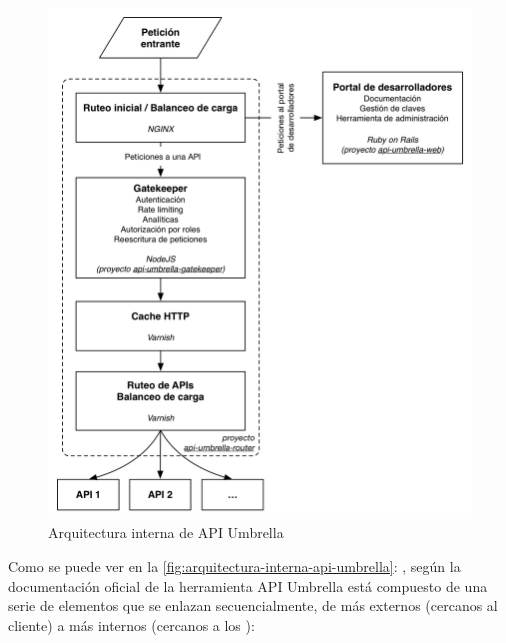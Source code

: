 \begin{figure}
  \includegraphics[width=\linewidth]{src/images/03-capitulo-3/tecnologias/api-umbrella/api-umbrella-arquitectura.png}
  \caption{Arquitectura interna de API Umbrella}
  \label{fig:arquitectura-interna-api-umbrella}
\end{figure}

Como se puede ver en la \autoref{fig:arquitectura-interna-api-umbrella}: , según la documentación oficial de la herramienta API Umbrella está compuesto de una serie de elementos que se enlazan secuencialmente, de más externos (cercanos al cliente) a más internos (cercanos a los ):

